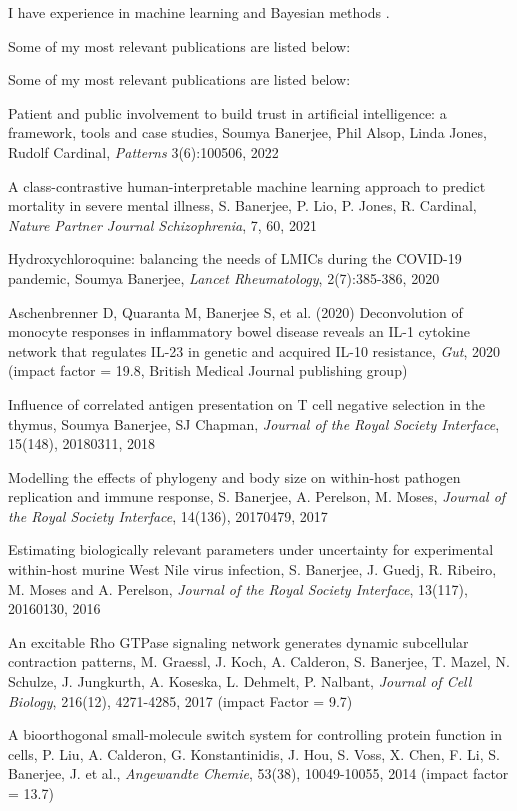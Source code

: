 \documentclass[10pt]{article}
\begin{document}
\begin{enumerate}
I have experience in machine learning \cite{Banerjee2021e} and Bayesian methods \cite{Banerjee2017g}. 

Some of my most relevant publications are listed below:


Some of my most relevant publications are listed below:

Patient and public involvement to build trust in artificial intelligence: a framework, tools and case studies, Soumya Banerjee, Phil Alsop, Linda Jones, Rudolf Cardinal, \textit{Patterns} 3(6):100506, 2022

A class-contrastive human-interpretable machine learning approach to predict mortality in severe mental illness, S. Banerjee, P. Lio, P. Jones, R. Cardinal, \textit{Nature Partner Journal Schizophrenia}, 7, 60, 2021

Hydroxychloroquine: balancing the needs of LMICs during the COVID-19 pandemic, Soumya Banerjee, \textit{Lancet Rheumatology}, 2(7):385-386, 2020

Aschenbrenner D, Quaranta M, Banerjee S,  et al. (2020) Deconvolution of monocyte responses in inflammatory bowel disease reveals an IL-1 cytokine network that regulates IL-23 in genetic and acquired IL-10 resistance, \textit{Gut}, 2020 (impact factor = 19.8, British Medical Journal publishing group)

Influence of correlated antigen presentation on T cell negative selection in the thymus, Soumya Banerjee, SJ Chapman, \textit{Journal of the Royal Society Interface}, 15(148), 20180311, 2018

Modelling the effects of phylogeny and body size on within-host pathogen
replication and immune response, S. Banerjee, A. Perelson, M. Moses, \textit{Journal of the Royal Society Interface}, 14(136), 20170479, 2017 

Estimating biologically relevant parameters under uncertainty for experimental within-host murine West Nile virus infection, S. Banerjee, J. Guedj, R. Ribeiro, M. Moses and A. Perelson, \textit{Journal of the Royal Society Interface}, 13(117), 20160130, 2016

An excitable Rho GTPase signaling network generates dynamic subcellular
contraction patterns, M. Graessl, J. Koch, A. Calderon, S. Banerjee, T. Mazel, N.
Schulze, J. Jungkurth, A. Koseska, L. Dehmelt, P. Nalbant, \textit{Journal of Cell Biology}, 216(12), 4271-4285, 2017 (impact Factor = 9.7)

A bioorthogonal small-molecule switch system for controlling protein function in
cells, P. Liu, A. Calderon, G. Konstantinidis, J. Hou, S. Voss, X. Chen, F. Li, S. Banerjee, J. et al., \textit{Angewandte Chemie}, 53(38), 10049-10055, 2014 (impact factor = 13.7)


\end{enumerate}
\end{document}
